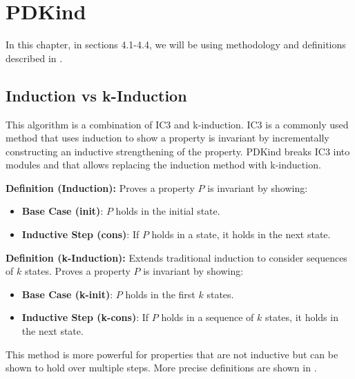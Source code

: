 \chapter{PDKind}

In this chapter, in sections 4.1-4.4, we will be using methodology and definitions described in \cite{7886665}.

\section{Induction vs k-Induction}

\noindent This algorithm is a combination of IC3 and k-induction.
IC3 is a commonly used method that uses induction to show a property is invariant by incrementally constructing an inductive strengthening of the property. PDKind breaks IC3 into modules and that allows replacing the induction method with k-induction.


\vspace{\baselineskip}\noindent \textbf{Definition (Induction):} Proves a property \( P \) is invariant by showing:
\begin{itemize}
    \item \textbf{Base Case (init)}: \( P \) holds in the initial state.
    \item \textbf{Inductive Step (cons)}: If \( P \) holds in a state, it holds in the next state.
\end{itemize}


\vspace{\baselineskip}\noindent \textbf{Definition (k-Induction):} Extends traditional induction to consider sequences of \( k \) states. Proves a property \( P \) is invariant by showing:
\begin{itemize}
    \item \textbf{Base Case (k-init)}: \( P \) holds in the first \( k \) states.
    \item \textbf{Inductive Step (k-cons)}: If \( P \) holds in a sequence of \( k \) states, it holds in the next state.
\end{itemize}

This method is more powerful for properties that are not inductive but can be shown to hold over multiple steps.
More precise definitions are shown in \cite{7886665}.


